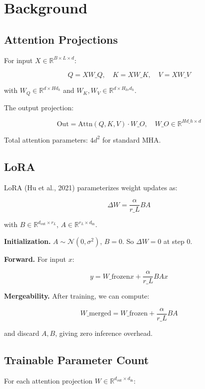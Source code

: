 \section{Background}

\subsection{Attention Projections}

For input $X \in \mathbb{R}^{B \times L \times d}$:

\[
Q = X W\_Q, \quad K = X W\_K, \quad V = X W\_V
\tag{3.1}
\]

with $W_Q \in \mathbb{R}^{d \times H d_h}$ and $W_K, W_V \in \mathbb{R}^{d \times H_{kv} d_h}$.

The output projection:

\[
\text{Out} = \text{Attn}(Q, K, V) \cdot W\_O, \quad W\_O \in \mathbb{R}^{H d\_h \times d}
\tag{3.2}
\]

Total attention parameters: $4 d^2$ for standard MHA.

\subsection{LoRA}

LoRA (Hu et al., 2021) parameterizes weight updates as:

\[
\Delta W = \frac{\alpha}{r\_L} B A
\tag{3.3}
\]

with $B \in \mathbb{R}^{d_\text{out} \times r_L}$, $A \in \mathbb{R}^{r_L \times d_\text{in}}$.

\textbf{Initialization.} $A \sim \mathcal{N}(0, \sigma^2)$, $B = 0$. So 
$\Delta W = 0$ at step 0.

\textbf{Forward.} For input $x$:

\[
y = W\_\text{frozen} x + \frac{\alpha}{r\_L} B A x
\tag{3.4}
\]

\textbf{Mergeability.} After training, we can compute:

\[
W\_\text{merged} = W\_\text{frozen} + \frac{\alpha}{r\_L} B A
\tag{3.5}
\]

and discard $A, B$, giving zero inference overhead.

\subsection{Trainable Parameter Count}

For each attention projection $W \in \mathbb{R}^{d_\text{out} \times d_\text{in}}$:

